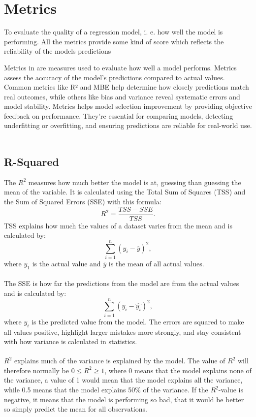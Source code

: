 
\section{Metrics}
To evaluate the quality of a regression model, i. e. how well the model is performing. All the metrics provide some kind of score which reflects the reliability of the models predictions

Metrics in are measures used to evaluate how well a model performs. Metrics assess the accuracy of the model’s predictions compared to actual values. Common metrics like R² and MBE help determine how closely predictions match real outcomes, while others like bias and variance reveal systematic errors and model stability. Metrics helps model selection improvement by providing objective feedback on performance. They’re essential for comparing models, detecting underfitting or overfitting, and ensuring predictions are reliable for real-world use.
\\\\

\subsection{R-Squared}
The $R^2$ measures how much better the model is at, guessing than guessing the mean of the variable. It is calculated using the Total Sum of Squares (TSS) and the Sum of Squared Errors (SSE) with this formula: $$R^2= \frac{TSS-SSE}{TSS}.$$ TSS explains how much the values of a dataset varies from the mean and is calculated by: 
$$\sum_{i=1}^{n}(y_i-\overline{y})^2,$$
where $y_1$ is the actual value and $\overline{y}$ is the mean of all actual values.
\\\\

\noindent The SSE is how far the predictions from the model are from the actual values and is calculated by:
$$\sum_{i=1}^{n}(y_i-\hat{y_i})^2,$$
where $\hat{y_i}$ is the predicted value from the model. The errors are squared to make all values positive, highlight larger mistakes more strongly, and stay consistent with how variance is calculated in statistics.
\\\\
$R^2$ explains much of the variance is explained by the model. The value of $R^2$ will therefore normally be $0\leq R^2 \geq 1$, where 0 means that the model explains none of the variance, a value of 1 would mean that the model explains all the variance, while 0.5 means that the model explains 50\% of the variance. If the $R^2$-value is negative, it means that the model is performing so bad, that it would be better so simply predict the mean for all observations.
\newpage

